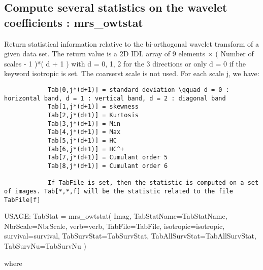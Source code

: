 \subsection{Compute several statistics on the wavelet coefficients : mrs\_owtstat}
Return statistical information relative to the bi-orthogonal wavelet transform of a given data set. The return value is a 2D IDL array 
of 9 elements $\times$ ( Number of scales - 1 )*( d + 1 ) with d = 0, 1, 2 for the 3 directions or only d = 0 if the keyword isotropic is set. 
The coarserst scale is not used. For each scale j, we have:
\begin{verbatim}
			Tab[0,j*(d+1)] = standard deviation \qquad d = 0 : horizontal band, d = 1 : vertical band, d = 2 : diagonal band
			Tab[1,j*(d+1)] = skewness
			Tab[2,j*(d+1)] = Kurtosis
			Tab[3,j*(d+1)] = Min
			Tab[4,j*(d+1)] = Max 
			Tab[5,j*(d+1)] = HC
			Tab[6,j*(d+1)] = HC^+
			Tab[7,j*(d+1)] = Cumulant order 5
			Tab[8,j*(d+1)] = Cumulant order 6

			If TabFile is set, then the statistic is computed on a set of images. Tab[*,*,f] will be the statistic related to the file TabFile[f]
\end{verbatim}
{\bf
\begin{center}
     USAGE: TabStat = mrs\_owtstat( Imag, TabStatName=TabStatName, NbrScale=NbrScale, verb=verb, TabFile=TabFile, isotropic=isotropic, 
     survival=survival, TabSurvStat=TabSurvStat, TabAllSurvStat=TabAllSurvStat, TabSurvNu=TabSurvNu )  
\end{center}}
where 

